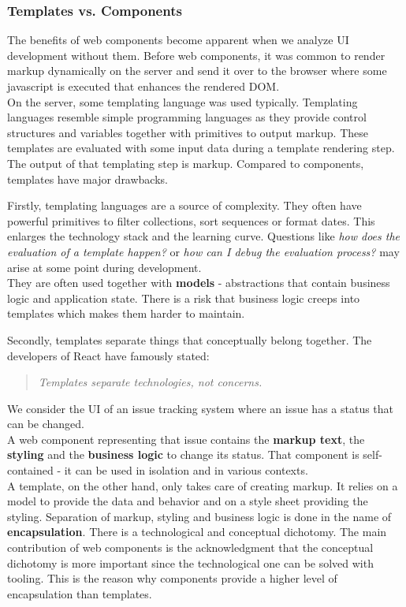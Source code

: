 \subsubsection{Templates vs. Components}
The benefits of web components become apparent when we analyze UI development without them. Before web components, it was common to render markup dynamically on the server and send it over to the browser where some \gls{javascript} is executed that enhances the rendered DOM. \\
On the server, some templating language was used typically. Templating languages resemble simple programming languages as they provide control structures and variables together with primitives to output markup. These templates are evaluated with some input data during a template rendering step. The output of that templating step is markup. Compared to components, templates have major drawbacks.

Firstly, templating languages are a source of complexity. They often have powerful primitives to filter collections, sort sequences or format dates. This enlarges the technology stack and the learning curve. Questions like \textit{how does the evaluation of a template happen?} or \textit{how can I debug the evaluation process?} may arise at some point during development. \\
They are often used together with \textbf{models} - abstractions that contain business logic and application state. There is a risk that business logic creeps into templates which makes them harder to maintain.

Secondly, templates separate things that conceptually belong together. The developers of React have famously stated:
\begin{quote}
\textit{Templates separate technologies, not concerns.}
\end{quote}
We consider the UI of an issue tracking system where an issue has a status that can be changed. \\ A web component representing that issue contains the \textbf{markup text}, the \textbf{styling} and the \textbf{business logic} to change its status. That component is self-contained - it can be used in isolation and in various contexts. \\
A template, on the other hand, only takes care of creating markup. It relies on a model to provide the data and behavior and on a style sheet providing the styling.
Separation of markup, styling and business logic is done in the name of \textbf{encapsulation}. There is a technological and conceptual dichotomy. The main contribution of web components is the acknowledgment that the conceptual dichotomy is more important since the technological one can be solved with tooling. This is the reason why components provide a higher level of encapsulation than templates.

